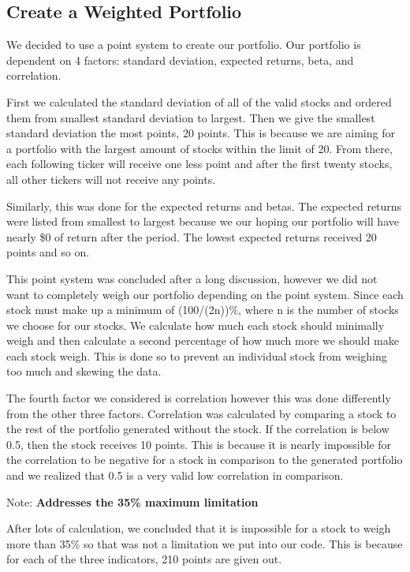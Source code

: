 \documentclass[11pt]{article}
\begin{document}
    \hypertarget{create-a-weighted-portfolio}{%
\subsection{Create a Weighted
Portfolio}\label{create-a-weighted-portfolio}}

We decided to use a point system to create our portfolio. Our portfolio
is dependent on 4 factors: standard deviation, expected returns, beta,
and correlation.

First we calculated the standard deviation of all of the valid stocks
and ordered them from smallest standard deviation to largest. Then we
give the smallest standard deviation the most points, 20 points. This is
because we are aiming for a portfolio with the largest amount of stocks
within the limit of 20. From there, each following ticker will receive
one less point and after the first twenty stocks, all other tickers will
not receive any points.

Similarly, this was done for the expected returns and betas. The
expected returns were listed from smallest to largest because we our
hoping our portfolio will have nearly \$0 of return after the period.
The lowest expected returns received 20 points and so on.

This point system was concluded after a long discussion, however we did
not want to completely weigh our portfolio depending on the point
system. Since each stock must make up a minimum of (100/(2n))\%, where n
is the number of stocks we choose for our stocks. We calculate how much
each stock should minimally weigh and then calculate a second percentage
of how much more we should make each stock weigh. This is done so to
prevent an individual stock from weighing too much and skewing the data.

The fourth factor we considered is correlation however this was done
differently from the other three factors. Correlation was calculated by
comparing a stock to the rest of the portfolio generated without the
stock. If the correlation is below 0.5, then the stock receives 10
points. This is because it is nearly impossible for the correlation to
be negative for a stock in comparison to the generated portfolio and we
realized that 0.5 is a very valid low correlation in comparison.

Note: \textbf{Addresses the 35\% maximum limitation}

After lots of calculation, we concluded that it is impossible for a
stock to weigh more than 35\% so that was not a limitation we put into
our code. This is because for each of the three indicators, 210 points
are given out.
\end{document}
